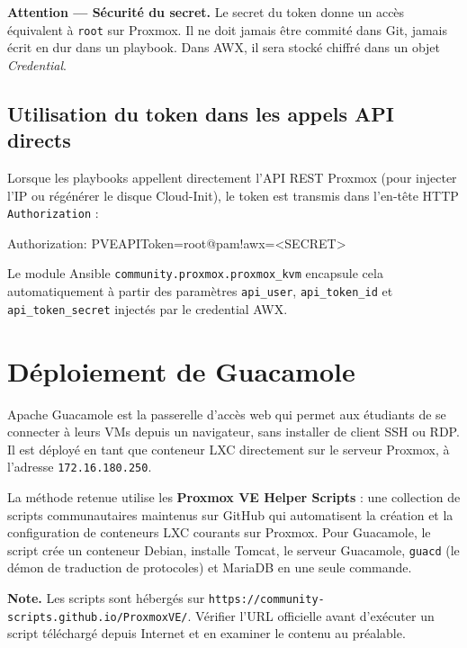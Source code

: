 \documentclass[a4paper]{article}
\newcommand{\cmd}[1]{\texttt{#1}}
\begin{document}
\begin{warnbox}
  \textbf{Attention --- Sécurité du secret.} Le secret du token donne un accès équivalent à \cmd{root} sur Proxmox. Il ne doit jamais être commité dans Git, jamais écrit en dur dans un playbook. Dans AWX, il sera stocké chiffré dans un objet \textit{Credential}.
\end{warnbox}

\subsection{Utilisation du token dans les appels API directs}

Lorsque les playbooks appellent directement l'API REST Proxmox (pour injecter l'IP ou régénérer le disque Cloud-Init), le token est transmis dans l'en-tête HTTP \cmd{Authorization} :

\begin{bashcode}
Authorization: PVEAPIToken=root@pam!awx=<SECRET>
\end{bashcode}

Le module Ansible \cmd{community.proxmox.proxmox\_kvm} encapsule cela automatiquement à partir des paramètres \cmd{api\_user}, \cmd{api\_token\_id} et \cmd{api\_token\_secret} injectés par le credential AWX.


\section{Déploiement de Guacamole}

Apache Guacamole est la passerelle d'accès web qui permet aux étudiants de se connecter à leurs VMs depuis un navigateur, sans installer de client SSH ou RDP. Il est déployé en tant que conteneur LXC directement sur le serveur Proxmox, à l'adresse \cmd{172.16.180.250}.

La méthode retenue utilise les \textbf{Proxmox VE Helper Scripts} : une collection de scripts communautaires maintenus sur GitHub qui automatisent la création et la configuration de conteneurs LXC courants sur Proxmox. Pour Guacamole, le script crée un conteneur Debian, installe Tomcat, le serveur Guacamole, \cmd{guacd} (le démon de traduction de protocoles) et MariaDB en une seule commande.

\begin{infobox}
  \textbf{Note.} Les scripts sont hébergés sur \cmd{https://community-scripts.github.io/ProxmoxVE/}. Vérifier l'URL officielle avant d'exécuter un script téléchargé depuis Internet et en examiner le contenu au préalable.
\end{infobox}
\end{document}
